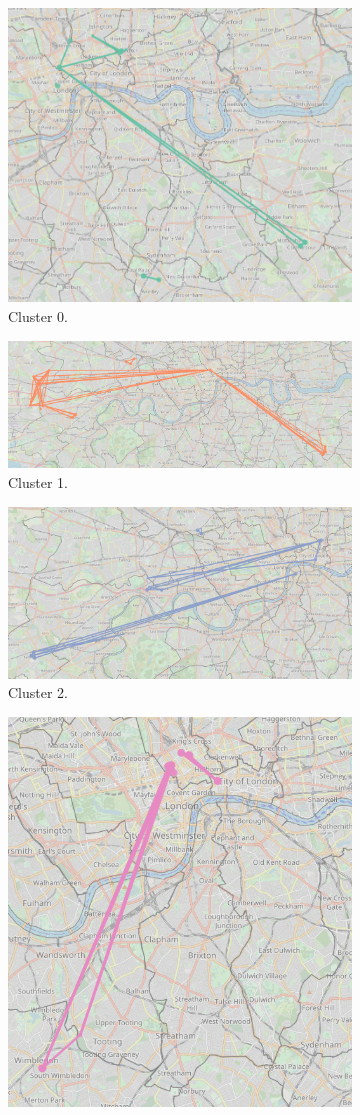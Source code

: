 \documentclass{article}
\theoremstyle{definition}
\theoremstyle{remark}
\begin{document}
\begin{figure}[!h]

\centering
\begin{subfigure}{0.6\textheight}
\centering
\includegraphics[width=0.4\linewidth]{figures/daytime_locals_c0.png}
\caption{Cluster 0.}
\label{fig:daytime_locals_c0}
\end{subfigure}
\begin{subfigure}{0.6\textheight}
\centering
\includegraphics[width=0.4\linewidth]{figures/daytime_locals_c1.png}
\caption{Cluster 1.}
\label{fig:daytime_locals_c1}
\end{subfigure}
\begin{subfigure}{0.6\textheight}
\centering
\includegraphics[width=0.4\linewidth]{figures/daytime_locals_c2.png}
\caption{Cluster 2.}
\label{fig:daytime_locals_c2}
\end{subfigure}
\begin{subfigure}{0.6\textheight}
\centering
\includegraphics[width=0.4\linewidth]{figures/daytime_locals_c3.png}

\end{subfigure}
\end{figure}
\end{document}
